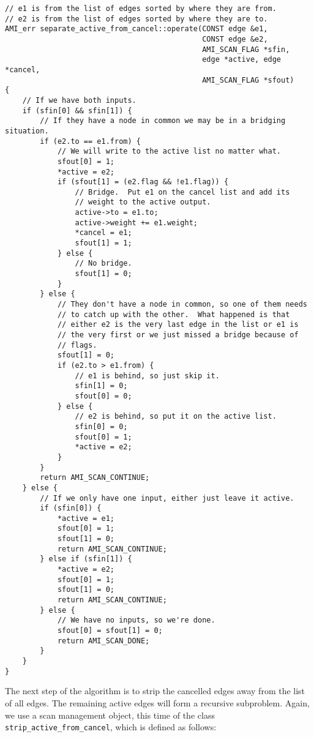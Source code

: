 \begin{verbatim}
// e1 is from the list of edges sorted by where they are from.
// e2 is from the list of edges sorted by where they are to.
AMI_err separate_active_from_cancel::operate(CONST edge &e1,
                                             CONST edge &e2, 
                                             AMI_SCAN_FLAG *sfin,
                                             edge *active, edge *cancel, 
                                             AMI_SCAN_FLAG *sfout)
{
    // If we have both inputs.
    if (sfin[0] && sfin[1]) {
        // If they have a node in common we may be in a bridging situation.
        if (e2.to == e1.from) {
            // We will write to the active list no matter what.
            sfout[0] = 1;
            *active = e2;
            if (sfout[1] = (e2.flag && !e1.flag)) {
                // Bridge.  Put e1 on the cancel list and add its
                // weight to the active output.
                active->to = e1.to;
                active->weight += e1.weight;
                *cancel = e1;
                sfout[1] = 1;
            } else {
                // No bridge.
                sfout[1] = 0;
            }
        } else {
            // They don't have a node in common, so one of them needs
            // to catch up with the other.  What happened is that
            // either e2 is the very last edge in the list or e1 is
            // the very first or we just missed a bridge because of
            // flags.
            sfout[1] = 0;                
            if (e2.to > e1.from) {
                // e1 is behind, so just skip it.
                sfin[1] = 0;
                sfout[0] = 0;
            } else {
                // e2 is behind, so put it on the active list.
                sfin[0] = 0;
                sfout[0] = 1;
                *active = e2;
            }
        }
        return AMI_SCAN_CONTINUE;
    } else {
        // If we only have one input, either just leave it active.
        if (sfin[0]) {
            *active = e1;
            sfout[0] = 1;
            sfout[1] = 0;
            return AMI_SCAN_CONTINUE;
        } else if (sfin[1]) {
            *active = e2;
            sfout[0] = 1;
            sfout[1] = 0;
            return AMI_SCAN_CONTINUE;
        } else {
            // We have no inputs, so we're done.
            sfout[0] = sfout[1] = 0;            
            return AMI_SCAN_DONE;
        }
    }
}
\end{verbatim}

The next step of the algorithm is to strip the cancelled edges away
from the list of all edges.  The remaining active edges will form a
recursive subproblem.  Again, we use a scan management object, this
time of the class \verb|strip_active_from_cancel|, which is defined as
follows:

